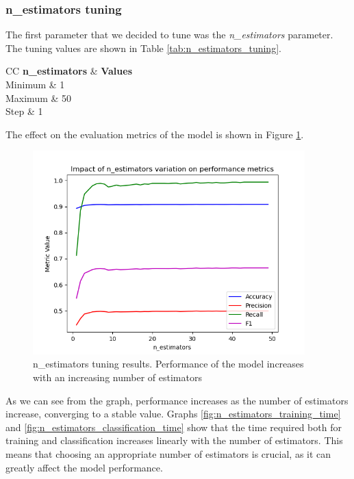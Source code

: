 \documentclass[futureinternet,article,submit,pdftex,moreauthors]{Definitions/mdpi}
\begin{document}
\subsubsection{n\_estimators tuning}

The first parameter that we decided to tune was the \textit{n\_estimators} parameter. The tuning values are shown in Table \ref{tab:n_estimators_tuning}.

\begin{table}[H]
	\caption{n\_estimators tuning values.}\label{tab:n_estimators_tuning}
	\begin{tabularx}{\textwidth}{CC}
	\toprule
	\textbf{n\_estimators} & \textbf{Values} \\
	\midrule
	Minimum & 1 \\
	Maximum & 50 \\
	Step & 1 \\
	\bottomrule
\end{tabularx}
\end{table}

The effect on the evaluation metrics of the model is shown in Figure \ref{fig:n_estimators_tuning}.

\begin{figure}[H]
	\centering
	\includegraphics[width=10.5cm]{img/nEstimatorsTuning.png}
	\caption{n\_estimators tuning results. Performance of the model increases with an increasing number of estimators}\label{fig:n_estimators_tuning}
\end{figure}
\unskip

As we can see from the graph, performance increases as the number of estimators increase, converging to a stable value. 
Graphs \ref{fig:n_estimators_training_time} and \ref{fig:n_estimators_classification_time} show that the time required both for training and classification increases linearly with the number of estimators.
This means that choosing an appropriate number of estimators is crucial, as it can greatly affect the model performance. 
\end{document}
